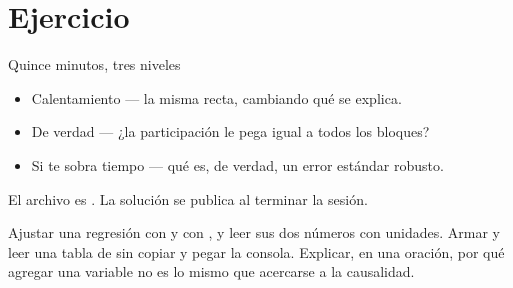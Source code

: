 \section{Ejercicio}

\begin{frame}{Quince minutos, tres niveles}
  \vspace{0.4em}
  \begin{itemize}\setlength{\itemsep}{1.0em}
    \item \ac{Calentamiento} — la misma recta, cambiando qué se explica.
    \item \ac{De verdad} — ¿la participación le pega igual a todos los
          bloques?
    \item \ac{Si te sobra tiempo} — qué es, de verdad, un error estándar
          robusto.
  \end{itemize}

  \vspace{1.2em}
  {\small\color{grisTenue}El archivo es . La solución
  se publica al terminar la sesión.}
\end{frame}

\yasabemos
  {Ajustar una regresión con  y con , y leer sus dos
  números con unidades.}
  {Armar y leer una tabla de  sin copiar y pegar la
  consola.}
  {Explicar, en una oración, por qué agregar una variable no es lo mismo
  que acercarse a la causalidad.}



